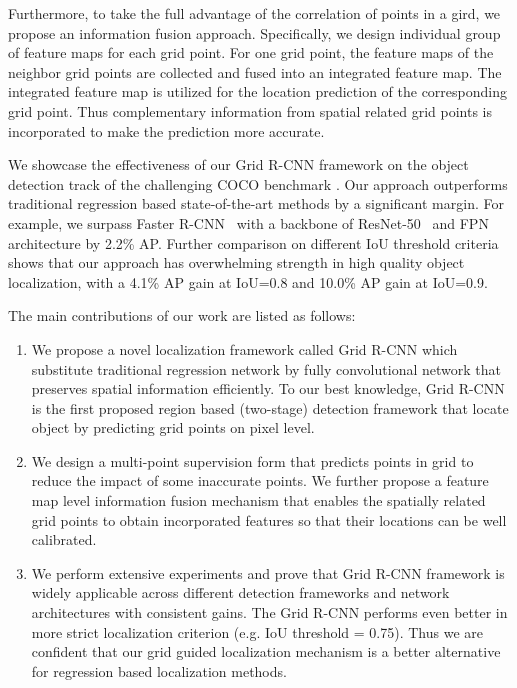 \documentclass[10pt,twocolumn,letterpaper]{article}
\begin{document}
Furthermore, to take the full advantage of the correlation of points in a gird, we propose an information fusion approach. Specifically, we design individual group of feature maps for each grid point. For one grid point, the feature maps of the neighbor grid points are collected and fused into an integrated feature map. 
The integrated feature map is utilized for the location prediction of the corresponding grid point. Thus complementary information from spatial related grid points is incorporated to make the prediction more accurate.

We showcase the effectiveness of our Grid R-CNN framework on the object detection track of the challenging COCO benchmark \cite{lin2014microsoft}. Our approach outperforms traditional regression based state-of-the-art methods by a significant margin. For example, we surpass Faster R-CNN~\cite{ren2015faster} with a backbone of ResNet-50~\cite{he2016deep} and FPN~\cite{lin2017feature} architecture by 2.2\% AP. Further comparison on different IoU threshold criteria shows that our approach has overwhelming strength in high quality object localization, with a 4.1\% AP gain at IoU=0.8 and 10.0\% AP gain at IoU=0.9.

The main contributions of our work are listed as follows:
\begin{enumerate}
\item We propose a novel localization framework called Grid R-CNN which substitute traditional regression network by fully convolutional network that preserves spatial information efficiently. To our best knowledge, Grid R-CNN is the first proposed region based (two-stage) detection framework that locate object by predicting grid points on pixel level.

\item We design a multi-point supervision form that predicts points in grid to reduce the impact of some inaccurate points. We further propose a feature map level information fusion mechanism that enables the spatially related grid points to obtain incorporated features so that their locations can be well calibrated.

\item We perform extensive experiments and prove that Grid R-CNN framework is widely applicable across different detection frameworks and network architectures with consistent gains. The Grid R-CNN performs even better in more strict localization criterion (e.g. IoU threshold = 0.75). Thus we are confident that our grid guided localization mechanism is a better alternative for regression based localization methods.
\end{enumerate}
\end{document}
